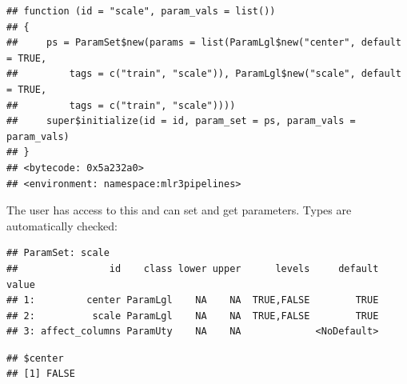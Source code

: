 \documentclass[]{scrbook}
\newenvironment{Shaded}{\begin{snugshade}}{\end{snugshade}}
\newcommand{\CommentTok}[1]{\textcolor[rgb]{0.56,0.35,0.01}{\textit{#1}}}
\newcommand{\KeywordTok}[1]{\textcolor[rgb]{0.13,0.29,0.53}{\textbf{#1}}}
\newcommand{\NormalTok}[1]{#1}
\newcommand{\OperatorTok}[1]{\textcolor[rgb]{0.81,0.36,0.00}{\textbf{#1}}}
\newcommand{\OtherTok}[1]{\textcolor[rgb]{0.56,0.35,0.01}{#1}}
\newcommand{\StringTok}[1]{\textcolor[rgb]{0.31,0.60,0.02}{#1}}
\renewenvironment{Shaded} {\begin{snugshade}\small} {\end{snugshade}}
\begin{document}
\begin{verbatim}
## function (id = "scale", param_vals = list()) 
## {
##     ps = ParamSet$new(params = list(ParamLgl$new("center", default = TRUE, 
##         tags = c("train", "scale")), ParamLgl$new("scale", default = TRUE, 
##         tags = c("train", "scale"))))
##     super$initialize(id = id, param_set = ps, param_vals = param_vals)
## }
## <bytecode: 0x5a232a0>
## <environment: namespace:mlr3pipelines>
\end{verbatim}

The user has access to this and can set and get parameters. Types are automatically checked:

\begin{Shaded}
\end{Shaded}

\begin{verbatim}
## ParamSet: scale
##                id    class lower upper      levels     default value
## 1:         center ParamLgl    NA    NA  TRUE,FALSE        TRUE      
## 2:          scale ParamLgl    NA    NA  TRUE,FALSE        TRUE      
## 3: affect_columns ParamUty    NA    NA             <NoDefault>
\end{verbatim}

\begin{Shaded}
\end{Shaded}

\begin{verbatim}
## $center
## [1] FALSE
\end{verbatim}

\begin{Shaded}
\end{Shaded}
\end{document}
